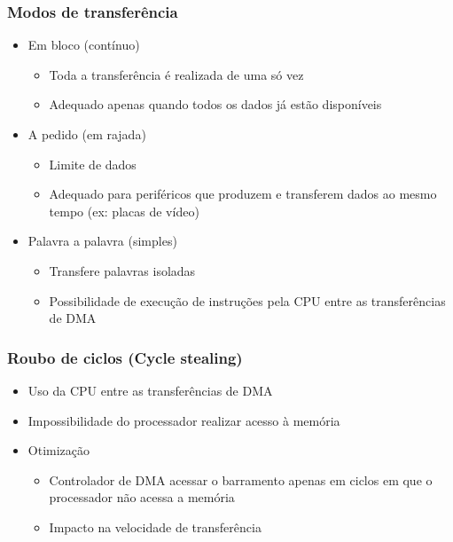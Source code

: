 \documentclass[aspectratio=169,
				xcolor=table]{beamer}
\begin{document}
	\begin{frame}[allowframebreaks]
		\frametitle{Modos de transferência}
		\begin{itemize}
			\item Em bloco (contínuo)
			\begin{itemize}
				\item Toda a transferência é realizada de uma só vez
				\item Adequado apenas quando todos os dados já estão disponíveis
			\end{itemize}
			\vspace{1em}
			\item A pedido (em rajada)
			\begin{itemize}
				\item Limite de dados 
				\item Adequado para periféricos que produzem e transferem dados ao mesmo tempo (ex: placas de vídeo)
			\end{itemize}
			\framebreak
			\item Palavra a palavra (simples)
			\begin{itemize}
				\item Transfere palavras isoladas
				\item Possibilidade de execução de instruções pela CPU entre as transferências de DMA
			\end{itemize}
		\end{itemize}
	\end{frame}
	
	\begin{frame}
		\frametitle{Roubo de ciclos (Cycle stealing)}
		\begin{itemize}
			\item Uso da CPU entre as transferências de DMA
			\vspace{1em}
			\item Impossibilidade do processador realizar acesso à memória
			\vspace{1em}
			\item Otimização
			\begin{itemize}
				\item Controlador de DMA acessar o barramento apenas em ciclos em que o processador não acessa a memória
				\item Impacto na velocidade de transferência
			\end{itemize}
		\end{itemize}
	\end{frame}
	
\end{document}
